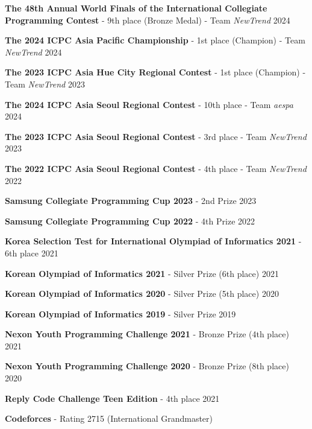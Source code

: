 
\par
{}
\par


\begin{cvhonors}

    
\cvhonor
    {\textbf{The 48th Annual World Finals of the International Collegiate Programming Contest} - 9th place (Bronze Medal) - Team \textit{NewTrend}}
    {2024}
    
\cvhonor
    {\textbf{The 2024 ICPC Asia Pacific Championship} - 1st place (Champion) - Team \textit{NewTrend}}
    {2024}

\cvhonor
    {\textbf{The 2023 ICPC Asia Hue City Regional Contest} - 1st place (Champion) - Team \textit{NewTrend}}
    {2023}

\cvhonor
    {\textbf{The 2024 ICPC Asia Seoul Regional Contest} - 10th place - Team \textit{aespa}}
    {2024}

\cvhonor
    {\textbf{The 2023 ICPC Asia Seoul Regional Contest} - 3rd place - Team \textit{NewTrend}}
    {2023}
    
\cvhonor
    {\textbf{The 2022 ICPC Asia Seoul Regional Contest} - 4th place - Team \textit{NewTrend}}
    {2022}

\cvhonor
    {\textbf{Samsung Collegiate Programming Cup 2023} - 2nd Prize}
    {2023}
    
\cvhonor
    {\textbf{Samsung Collegiate Programming Cup 2022} - 4th Prize}
    {2022}

\cvhonor
    {\textbf{Korea Selection Test for International Olympiad of Informatics 2021} - 6th place}
    {2021}

\cvhonor
    {\textbf{Korean Olympiad of Informatics 2021} - Silver Prize (6th place)}
    {2021}
    
\cvhonor
    {\textbf{Korean Olympiad of Informatics 2020} - Silver Prize (5th place)}
    {2020}
        
\cvhonor
    {\textbf{Korean Olympiad of Informatics 2019} - Silver Prize}
    {2019}
    
\cvhonor
    {\textbf{Nexon Youth Programming Challenge 2021} - Bronze Prize (4th place)}
    {2021}
    
\cvhonor
    {\textbf{Nexon Youth Programming Challenge 2020} - Bronze Prize (8th place)}
    {2020}

\cvhonor
    {\textbf{Reply Code Challenge Teen Edition} - 4th place}
    {2021}

\cvhonor
    {\textbf{Codeforces} - Rating 2715 (International Grandmaster)}
    {}
    
\end{cvhonors}

